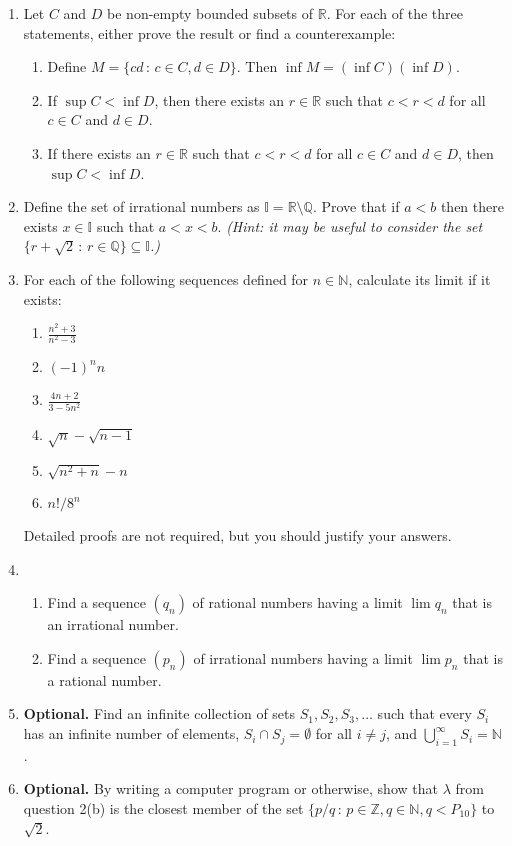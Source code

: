 \documentclass[12pt]{article}
\newcommand{\N}{\mathbb{N}}
\newcommand{\I}{\mathbb{I}}
\newcommand{\Z}{\mathbb{Z}}
\newcommand{\Q}{\mathbb{Q}}
\newcommand{\R}{\mathbb{R}}
\newcommand{\sep}{\,:\,}
\begin{document}
\begin{enumerate}
  \item Let $C$ and $D$ be non-empty bounded subsets of $\R$. For each of the three statements, either prove the result or find a counterexample:
    \begin{enumerate}
      \item Define $M=\{cd \sep c\in C, d\in D\}$. Then $\inf M = (\inf C)(\inf D)$.
      \item If $\sup C <\inf D$, then there exists an $r\in \R$ such that $c<r<d$ for all $c\in C$ and $d\in D$.
      \item If there exists an $r\in \R$ such that $c<r<d$ for all $c\in C$ and $d\in D$, then $\sup C<\inf D$.
    \end{enumerate}
  \item Define the set of irrational numbers as $\I=\R \setminus \Q$. Prove that if
    $a<b$ then there exists $x\in\I$ such that $a<x<b$. \textit{(Hint: it may be useful to consider the
    set $\{ r+\sqrt2 \sep r\in \Q\} \subseteq \I$.)}
  \item For each of the following sequences defined for $n\in \N$, calculate
    its limit if it exists:
    \begin{enumerate}
      \item $\frac{n^2+3}{n^2-3}$
      \item $(-1)^n n$
      \item $\frac{4n+2}{3-5n^2}$
      \item $\sqrt{n}-\sqrt{n-1}$
      \item $\sqrt{n^2+n}-n$
      \item $n!/8^n$
    \end{enumerate}
    Detailed proofs are not required, but you should justify your answers.
  \item
    \begin{enumerate}
      \item Find a sequence $(q_n)$ of rational numbers having a limit $\lim
        q_n$ that is an irrational number.
      \item Find a sequence $(p_n)$ of irrational numbers having a limit $\lim
        p_n$ that is a rational number.
    \end{enumerate}    
  \item \textbf{Optional.} Find an infinite collection of sets $S_1, S_2, S_3,
    \ldots$ such that every $S_i$ has an infinite number of elements, $S_i \cap
    S_j = \emptyset$ for all $i\ne j$, and $\bigcup_{i=1}^\infty S_i = \N$.
  \item \textbf{Optional.} By writing a computer program or otherwise, show
    that $\lambda$ from question 2(b) is the closest member of the set $\{p/q
    \sep p\in \Z, q \in \N, q<P_{10}\}$ to $\sqrt{2}$.
\end{enumerate}
\end{document}
